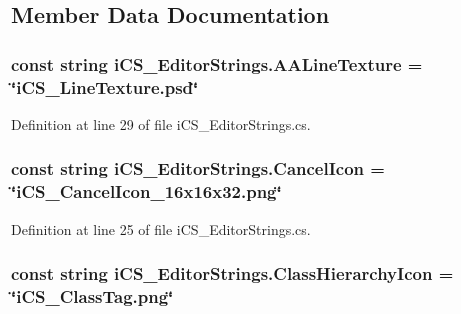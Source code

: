 \subsection{Member Data Documentation}
\hypertarget{classi_c_s___editor_strings_ac1af6f642c09870c1794d19d37a6d6e0}{
\subsubsection[{A\+A\+Line\+Texture}]{\setlength{\rightskip}{0pt plus 5cm}const string i\+C\+S\+\_\+\+Editor\+Strings.\+A\+A\+Line\+Texture = \char`\"{}i\+C\+S\+\_\+\+Line\+Texture.\+psd\char`\"{}}}\label{classi_c_s___editor_strings_ac1af6f642c09870c1794d19d37a6d6e0}


Definition at line 29 of file i\+C\+S\+\_\+\+Editor\+Strings.\+cs.

\hypertarget{classi_c_s___editor_strings_aeccdbbc5d7e36f6f27d180b77b845199}{
\subsubsection[{Cancel\+Icon}]{\setlength{\rightskip}{0pt plus 5cm}const string i\+C\+S\+\_\+\+Editor\+Strings.\+Cancel\+Icon = \char`\"{}i\+C\+S\+\_\+\+Cancel\+Icon\+\_\+16x16x32.\+png\char`\"{}}}\label{classi_c_s___editor_strings_aeccdbbc5d7e36f6f27d180b77b845199}


Definition at line 25 of file i\+C\+S\+\_\+\+Editor\+Strings.\+cs.

\hypertarget{classi_c_s___editor_strings_a04f48a5337419e926cb2f51e8cd9324f}{
\subsubsection[{Class\+Hierarchy\+Icon}]{\setlength{\rightskip}{0pt plus 5cm}const string i\+C\+S\+\_\+\+Editor\+Strings.\+Class\+Hierarchy\+Icon = \char`\"{}i\+C\+S\+\_\+\+Class\+Tag.\+png\char`\"{}}}\label{classi_c_s___editor_strings_a04f48a5337419e926cb2f51e8cd9324f}


